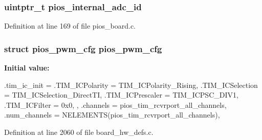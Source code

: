 \hypertarget{group___flying_f3_gafb354658d0ba22815d8632d97c062c0b}{
\subsubsection[{pios\-\_\-internal\-\_\-adc\-\_\-id}]{\setlength{\rightskip}{0pt plus 5cm}uintptr\-\_\-t {\bf pios\-\_\-internal\-\_\-adc\-\_\-id}}}\label{group___flying_f3_gafb354658d0ba22815d8632d97c062c0b}


\-Definition at line 169 of file pios\-\_\-board.\-c.

\hypertarget{group___flying_f3_ga7587f8e174df90bef8cec1edfa9e14c1}{
\subsubsection[{pios\-\_\-pwm\-\_\-cfg}]{\setlength{\rightskip}{0pt plus 5cm}struct {\bf pios\-\_\-pwm\-\_\-cfg} {\bf pios\-\_\-pwm\-\_\-cfg}}}\label{group___flying_f3_ga7587f8e174df90bef8cec1edfa9e14c1}
{\bfseries \-Initial value\-:}
\begin{DoxyCode}
 {
        .tim_ic_init = {
                .TIM_ICPolarity = TIM_ICPolarity_Rising,
                .TIM_ICSelection = TIM_ICSelection_DirectTI,
                .TIM_ICPrescaler = TIM_ICPSC_DIV1,
                .TIM_ICFilter = 0x0,
        },
        .channels = pios_tim_rcvrport_all_channels,
        .num_channels = NELEMENTS(pios_tim_rcvrport_all_channels),
}
\end{DoxyCode}


\-Definition at line 2060 of file board\-\_\-hw\-\_\-defs.\-c.

